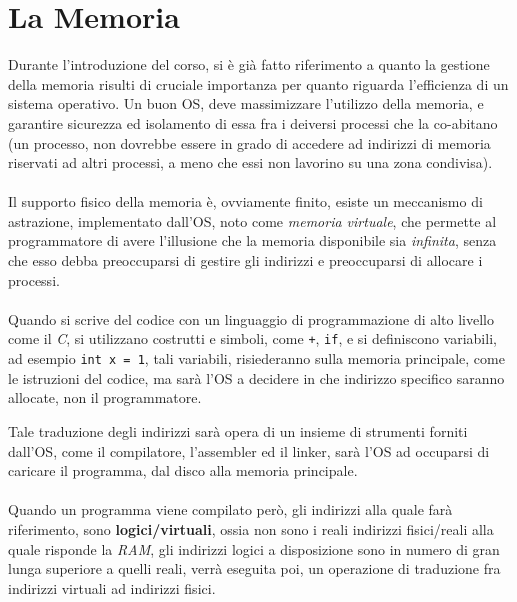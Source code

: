 \documentclass[12pt, letterpaper]{article}
\newcommand{\code}[1]{\colorbox{light-gray}{\texttt{#1}}}
\newcommand{\acc}{\\\hphantom{}\\}
\begin{document}
\section{La Memoria}
Durante l'introduzione del corso, si è già fatto riferimento a quanto la gestione della memoria risulti di cruciale 
importanza per quanto riguarda l'efficienza di un sistema operativo. Un buon OS, deve massimizzare l'utilizzo della 
memoria, e garantire sicurezza ed isolamento di essa fra i deiversi processi che la co-abitano (un processo, non 
dovrebbe essere in grado di accedere ad indirizzi di memoria riservati ad altri processi, a meno che essi non lavorino 
su una zona condivisa).\acc 
Il supporto fisico della memoria è, ovviamente finito, esiste un meccanismo di astrazione, implementato 
dall'OS, noto come \textit{memoria virtuale}, che permette al programmatore di avere l'illusione che la memoria 
disponibile sia \textit{infinita}, senza che esso debba preoccuparsi di gestire gli indirizzi e preoccuparsi di 
allocare i processi.\acc 
Quando si scrive del codice con un linguaggio di programmazione di alto livello come il \textit{C}, si utilizzano 
costrutti e simboli, come \code{+}, \code{if}, e si definiscono variabili, ad esempio \code{int x = 1}, tali variabili, 
risiederanno sulla memoria principale, come le istruzioni del codice, ma sarà l'OS a decidere in che indirizzo specifico saranno allocate, non il 
programmatore.

Tale traduzione degli indirizzi sarà opera di un insieme di strumenti forniti dall'OS, come il compilatore, l'assembler 
ed il linker, sarà l'OS ad occuparsi di caricare il programma, dal disco alla memoria principale.\acc 
Quando un programma viene compilato però, gli indirizzi alla quale farà riferimento, sono \textbf{logici/virtuali}, ossia 
non sono i reali indirizzi fisici/reali alla quale risponde la \textit{RAM}, gli indirizzi logici a disposizione sono in numero di gran 
lunga superiore a quelli reali, verrà eseguita poi, un operazione di traduzione fra indirizzi virtuali ad indirizzi fisici.
\end{document}
